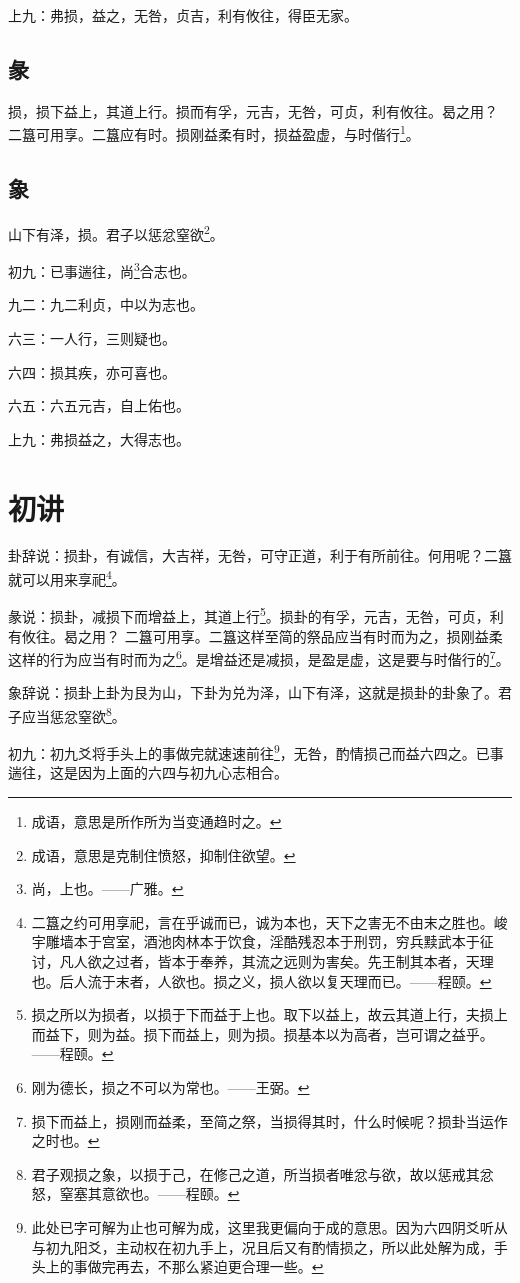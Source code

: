 \documentclass[12pt,oneside]{book}
\begin{document}
上九：弗损，益之，无咎，贞吉，利有攸往，得臣无家。

\subsection{彖}
损，损下益上，其道上行。损而有孚，元吉，无咎，可贞，利有攸往。曷之用？ 二簋可用享。二簋应有时。损刚益柔有时，损益盈虚，与时偕行\footnote{成语，意思是所作所为当变通趋时之。}。

\subsection{象}
山下有泽，损。君子以惩忿窒欲\footnote{成语，意思是克制住愤怒，抑制住欲望。}。

初九：已事遄往，尚\footnote{尚，上也。——广雅。}合志也。

九二：九二利贞，中以为志也。

六三：一人行，三则疑也。

六四：损其疾，亦可喜也。

六五：六五元吉，自上佑也。

上九：弗损益之，大得志也。

\section{初讲}
卦辞说：损卦，有诚信，大吉祥，无咎，可守正道，利于有所前往。何用呢？二簋就可以用来享祀\footnote{二簋之约可用享祀，言在乎诚而已，诚为本也，天下之害无不由末之胜也。峻宇雕墙本于宫室，酒池肉林本于饮食，淫酷残忍本于刑罚，穷兵黩武本于征讨，凡人欲之过者，皆本于奉养，其流之远则为害矣。先王制其本者，天理也。后人流于末者，人欲也。损之义，损人欲以复天理而已。——程颐。}。

彖说：损卦，减损下而增益上，其道上行\footnote{损之所以为损者，以损于下而益于上也。取下以益上，故云其道上行，夫损上而益下，则为益。损下而益上，则为损。损基本以为高者，岂可谓之益乎。——程颐。}。损卦的有孚，元吉，无咎，可贞，利有攸往。曷之用？ 二簋可用享。二簋这样至简的祭品应当有时而为之，损刚益柔这样的行为应当有时而为之\footnote{刚为德长，损之不可以为常也。——王弼。}。是增益还是减损，是盈是虚，这是要与时偕行的\footnote{损下而益上，损刚而益柔，至简之祭，当损得其时，什么时候呢？损卦当运作之时也。}。

象辞说：损卦上卦为艮为山，下卦为兑为泽，山下有泽，这就是损卦的卦象了。君子应当惩忿窒欲\footnote{君子观损之象，以损于己，在修己之道，所当损者唯忿与欲，故以惩戒其忿怒，窒塞其意欲也。——程颐。}。

初九：初九爻将手头上的事做完就速速前往\footnote{此处已字可解为止也可解为成，这里我更偏向于成的意思。因为六四阴爻听从与初九阳爻，主动权在初九手上，况且后又有酌情损之，所以此处解为成，手头上的事做完再去，不那么紧迫更合理一些。}，无咎，酌情损己而益六四之。已事遄往，这是因为上面的六四与初九心志相合。
\end{document}
